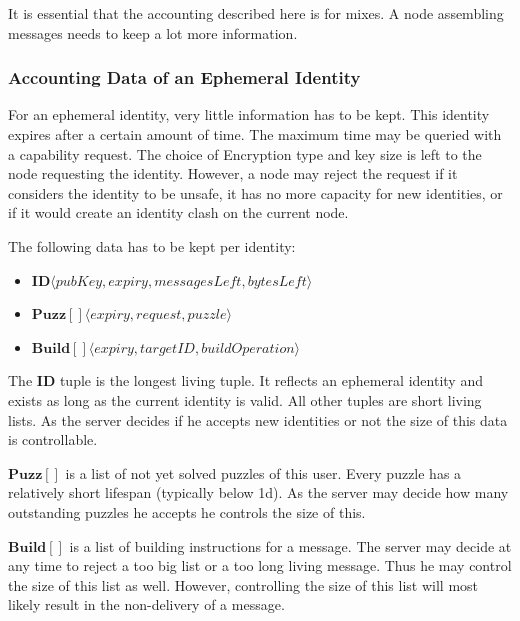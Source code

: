 It is essential that the accounting described here is for mixes. A node assembling messages needs to keep a lot more information.

\subsubsection{Accounting Data of an Ephemeral Identity}
For an ephemeral identity, very little information has to be kept. This identity expires after a certain amount of time. The maximum time may be queried with a capability request. The choice of Encryption type and key size is left to the node requesting the identity. However, a node may reject the request if it considers the identity to be unsafe, it has no more capacity for new identities, or if it would create an identity clash on the current node.

The following data has to be kept per identity:
\begin{itemize}
	\item $\mathbf{ID}\langle pubKey, expiry, messagesLeft, bytesLeft \rangle$
	\item $\mathbf{Puzz[]}\langle expiry, request, puzzle \rangle$
	\item $\mathbf{Build[]}\langle expiry, targetID, buildOperation \rangle$
\end{itemize}
The $\mathbf{ID}$ tuple is the longest living tuple. It reflects an ephemeral identity and exists as long as the current identity is valid. All other tuples are short living lists. As the server decides if he accepts new identities or not the size of this data is controllable.

$\mathbf{Puzz[]}$ is a list of not yet solved puzzles of this user. Every puzzle has a relatively short lifespan (typically below 1d). As the server may decide how many outstanding puzzles he accepts he controls the size of this.

$\mathbf{Build[]}$ is a list of building instructions for a message. The server may decide at any time to reject a too big list or a too long living message. Thus he may control the size of this list as well. However, controlling the size of this list will most likely result in the non-delivery of a message.


